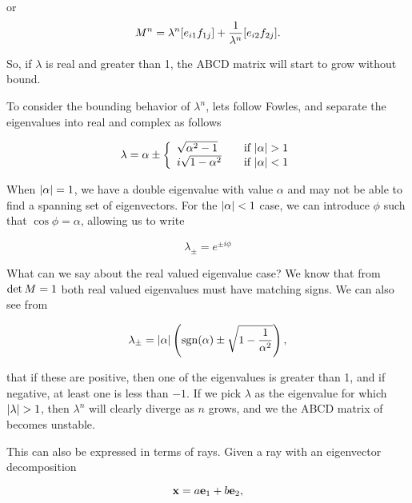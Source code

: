 {or
\begin{dmath}\label{eqn:problemSet4Problem2:320}
M^n
=
\lambda^n [ e_{i 1} f_{1 j} ] + \inv{\lambda^n} [ e_{i 2} f_{2 j} ].
\end{dmath}

So, if $\lambda$ is real and greater than 1, the ABCD matrix will start to grow without bound.

To consider the bounding behavior of $\lambda^n$, lets follow Fowles, and separate the eigenvalues into real and complex as follows

\begin{dmath}\label{eqn:problemSet4Problem2:180}
\lambda = \alpha \pm
\left\{
\begin{array}{l l}
\sqrt{\alpha^2 - 1} & \quad \mbox{if $\Abs{\alpha} > 1$} \\
i \sqrt{1 - \alpha^2} & \quad \mbox{if $\Abs{\alpha} < 1$}
\end{array}
\right.
\end{dmath}

When ${\left\lvert{\alpha}\right\rvert} = 1$, we have a double eigenvalue with value $\alpha$ and may not be able to find a spanning set of eigenvectors.  For the $\Abs{\alpha} < 1$ case, we can introduce $\phi$ such that $\cos\phi = \alpha$, allowing us to write

\begin{dmath}\label{eqn:problemSet4Problem2:1100}
\lambda_{\pm} = e^{\pm i \phi}
\end{dmath}

What can we say about the real valued eigenvalue case?  We know that from $\operatorname{det} M = 1$ both real valued eigenvalues must have matching signs.  We can also see from

\begin{dmath}\label{eqn:problemSet4Problem2:240}
\lambda_{\pm} = \Abs{\alpha} \left( \sgn(\alpha) \pm \sqrt{1 - \inv{\alpha^2}} \right),
\end{dmath}

that if these are positive, then one of the eigenvalues is greater than 1, and if negative, at least one is less than $-1$.  If we pick $\lambda$ as the eigenvalue for which ${\left\lvert{\lambda}\right\rvert} > 1$, then $\lambda^n$ will clearly diverge as $n$ grows, and we the ABCD matrix of  becomes unstable.

This can also be expressed in terms of rays.  Given a ray with an eigenvector decomposition

\begin{dmath}\label{eqn:problemSet4Problem2:340}
\Bx = a \Be_1 + b \Be_2,
\end{dmath}

}
